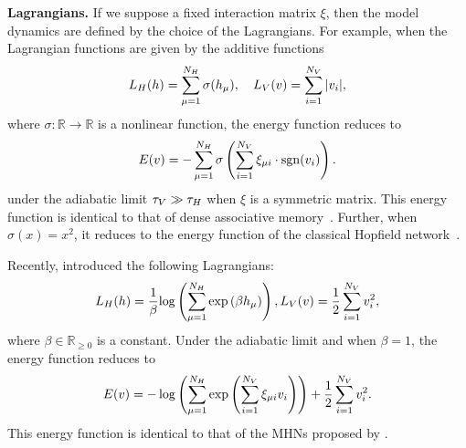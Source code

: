 \noindent \textbf{Lagrangians.}
If we suppose a fixed interaction matrix $\xi$, then the model dynamics are defined by the choice of the Lagrangians.
For example, when the Lagrangian functions are given by the additive functions
\begin{align}
\label{eq:lag_classic}
L_{H}(h) = \sum_{\mu = 1}^{N_{H}} \sigma(h_{\mu}),
\quad
L_{V}(v) = \sum_{i = 1}^{N_{V}} |v_{i}|,
\end{align}
where $\sigma: \mathbb{R} \to \mathbb{R}$ is a nonlinear function, the energy function reduces to
\begin{align}
E(v) = 
- \sum_{\mu=1}^{N_{H}} \sigma \left( \sum_{i=1}^{N_{V}} \xi_{\mu i} \cdot \mathrm{sgn}(v_{i}) \right).
\end{align}
under the adiabatic limit $\tau_{V} \gg \tau_{H}$ when $\xi$ is a symmetric matrix.
This energy function is identical to that of dense associative memory~\citep{krotov16dense}.
Further, when $\sigma(x) = x^{2}$, it reduces to the energy function of the classical Hopfield network~\citep{hopfield82}.

Recently, \citet{krotov2021large} introduced the following Lagrangians:
\begin{align}
\label{eq:lag_modern}
\hspace{-5pt}
L_{H}(h) = \frac{1}{\beta}\text{log} \left(\sum^{N_{H}}_{\mu=1} \exp\left(\beta h_{\mu}\right)\right),
L_{V}(v) = \frac{1}{2} \sum^{N_{V}}_{i=1} v_{i}^2,
\hspace{-5pt}
\end{align}
where $\beta \in \mathbb{R}_{\ge 0}$ is a constant.
Under the adiabatic limit and when $\beta = 1$, the energy function reduces to
\begin{align}
\label{eq:energy_modern}
E(v) = 
- \log \left( \sum_{\mu=1}^{N_{H}} \exp \left( \sum_{i=1}^{N_{V}} \xi_{\mu i} v_{i} \right)\right)
+ \frac{1}{2} \sum_{i=1}^{N_{V}} v_{i}^{2}.
\end{align}
This energy function is identical to that of the MHNs proposed by \citet{ramsauer21hopfieldallyouneed}.

